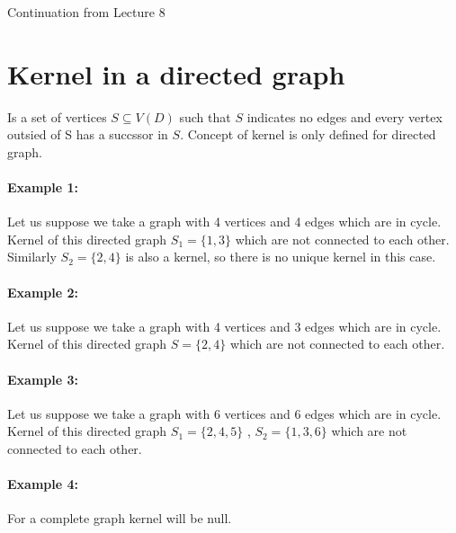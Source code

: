 




Continuation from Lecture 8

\section{Kernel in a directed graph}

Is a set of vertices $S \subseteq V(D)$ such that $S$ indicates no edges and every vertex outsied of S has a succssor in $S$. Concept of kernel is only defined for directed graph. 

\paragraph{Example 1:}Let us suppose we take a graph with 4 vertices and 4 edges which are in cycle. Kernel of this directed graph $ S_1 = \{1, 3\}$ which are not connected to each other. Similarly $ S_2 = \{2, 4\}$ is also a kernel, so there is no unique kernel in this case.

\paragraph{Example 2:}Let us suppose we take a graph with 4 vertices and 3 edges which are in cycle. Kernel of this directed graph $ S = \{2, 4\}$ which are not connected to each other. 

\paragraph{Example 3:}Let us suppose we take a graph with 6 vertices and 6 edges which are in cycle. Kernel of this directed graph $ S_1 = \{2, 4, 5\}$ , $ S_2 = \{1, 3, 6\}$ which are not connected to each other. 

\paragraph{Example 4:}For a complete graph kernel will be null. 

